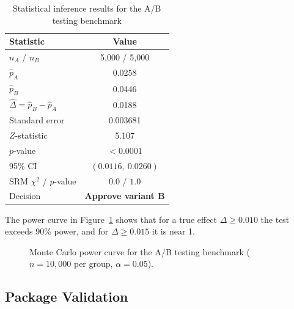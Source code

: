 \begin{table}[h]
\centering
\caption{Statistical inference results for the A/B testing benchmark}
\label{tab:ab_results}
\begin{tabular}{l c}
\toprule
Statistic & Value \\
\midrule
$n_A$ / $n_B$                         & 5{,}000 / 5{,}000 \\
$\hat{p}_A$                           & 0.0258 \\
$\hat{p}_B$                           & 0.0446 \\
$\hat{\Delta} = \hat{p}_B - \hat{p}_A$& 0.0188 \\
Standard error                        & 0.003681 \\
$Z$-statistic                         & 5.107 \\
$p$-value                             & $<0.0001$ \\
95\% CI                               & $(0.0116,\ 0.0260)$ \\
SRM $\chi^2$ / $p$-value              & $0.0$ / $1.0$ \\
Decision                              & \textbf{Approve variant B} \\
\bottomrule
\end{tabular}
\end{table}

The power curve in Figure~\ref{fig:power_curve} shows that for a true
effect $\Delta \geq 0.010$ the test exceeds 90\% power, and for
$\Delta \geq 0.015$ it is near 1.

\begin{figure}[h]
\centering
{}
\caption{Monte Carlo power curve for the A/B testing benchmark
         ($n = 10{,}000$ per group, $\alpha = 0.05$).}
\label{fig:power_curve}
\end{figure}

\subsection{Package Validation}

